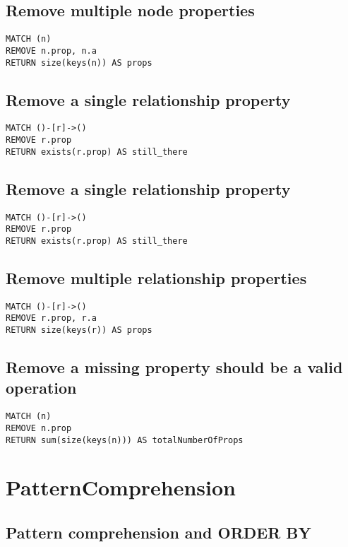 \subsection{Remove multiple node properties}

\begin{lstlisting}
MATCH (n)
REMOVE n.prop, n.a
RETURN size(keys(n)) AS props
\end{lstlisting}

\subsection{Remove a single relationship property}

\begin{lstlisting}
MATCH ()-[r]->()
REMOVE r.prop
RETURN exists(r.prop) AS still_there
\end{lstlisting}

\subsection{Remove a single relationship property}

\begin{lstlisting}
MATCH ()-[r]->()
REMOVE r.prop
RETURN exists(r.prop) AS still_there
\end{lstlisting}

\subsection{Remove multiple relationship properties}

\begin{lstlisting}
MATCH ()-[r]->()
REMOVE r.prop, r.a
RETURN size(keys(r)) AS props
\end{lstlisting}

\subsection{Remove a missing property should be a valid operation}

\begin{lstlisting}
MATCH (n)
REMOVE n.prop
RETURN sum(size(keys(n))) AS totalNumberOfProps
\end{lstlisting}
\section{PatternComprehension}


\subsection{Pattern comprehension and ORDER BY}

